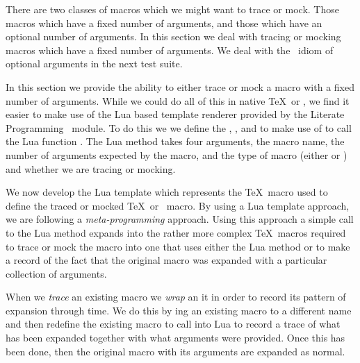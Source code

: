 \stopTestSuite


There are two classes of macros which we might want to trace or mock. 
Those macros which have a fixed number of arguments, and those which have 
an optional number of arguments. In this section we deal with tracing or 
mocking macros which have a fixed number of arguments. We deal with the 
\ConTeXt\ idiom of optional arguments in the next test suite. 

In this section we provide the ability to either trace or mock a macro 
with a fixed number of arguments. While we could do all of this in native 
\TeX\ or \ConTeXt, we find it easier to make use of the Lua based template 
renderer provided by the Literate Programming \ConTeXt\ module. To do this 
we we define the \type{\traceTexMacro}, \type{\traceContextMacro}, 
\type{\mockTexMacro} and \type{\mockContextMacro} to make use of 
\type{\directlua} to call the Lua function . The Lua 
 method takes four arguments, the macro name, the 
number of arguments expected by the macro, and the type of macro (either 
 or ) and whether we are tracing or mocking. 

\startMkIVCode
\def\traceTexMacro#1#2{%
  \directlua{%
    thirddata.contests.createMacro('#1', #2, 'tex', 'trace')
  }
}

\def\traceContextMacro#1#2{%
  \directlua{%
    thirddata.contests.createMacro('#1', #2, 'context', 'trace')
  }
}

\def\mockTexMacro#1#2{%
  \directlua{%
    thirddata.contests.createMacro('#1', #2, 'tex', 'mock')
  }
}

\def\mockContextMacro#1#2{%
  \directlua{%
    thirddata.contests.createMacro('#1', #2, 'context', 'mock')
  }
}
\stopMkIVCode

We now develop the Lua template which represents the \TeX\ macro used to 
define the traced or mocked \TeX\ or \ConTeXt\ macro. By using a Lua 
template approach, we are following a \emph{meta-programming} approach. 
Using this approach a simple call to the Lua method  
expands into the rather more complex \TeX\ macros required to trace or 
mock the macro into one that uses either the Lua method 
 or  to make a record of the 
fact that the original macro was expanded with a particular collection of 
arguments. 

When we \emph{trace} an existing macro we \emph{wrap} an it in order to 
record its pattern of expansion through time. We do this by \type{\let}ing 
an existing macro to a different name and then redefine the existing macro 
to call into Lua to record a trace of what has been expanded together with 
what arguments were provided. Once this has been done, then the original 
macro with its arguments are expanded as normal. 

